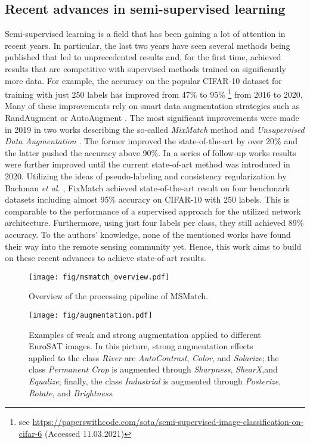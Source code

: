 \documentclass[journal]{IEEEtran}
\newcommand{\etal}{\textit{et al.}}
\begin{document}
\subsection{Recent advances in semi-supervised learning}

Semi-supervised learning is a field that has been gaining a lot of attention in recent years. In particular, the last two years have seen several methods being published that led to unprecedented results and, for the first time, achieved results that are competitive with supervised methods trained on significantly more data. For example, the accuracy on the popular CIFAR-10 dataset \cite{krizhevsky2009} for training with just 250 labels has improved from 47\% to 95\% \footnote{see \url{ https://paperswithcode.com/sota/semi-supervised-image-classification-on-cifar-6} (Accessed 11.03.2021)} from 2016 to 2020. Many of these improvements rely on smart data augmentation strategies such as RandAugment \cite{cubuk2020} or AutoAugment \cite{cubuk2018}. The most significant improvements were made in 2019 in two works describing the so-called \textit{MixMatch} \cite{berthelot2019} method and \textit{Unsupervised Data Augmentation} \cite{xie2019UDA}. The former improved the state-of-the-art by over 20\% and the latter pushed the accuracy above 90\%. In a series of follow-up works \cite{berthelot2019remixmatch,nair2019} results were further improved until the current state-of-art method was introduced in 2020. Utilizing the ideas of pseudo-labeling and consistency regularization by Bachman \etal{} \cite{bachman2014}, FixMatch \cite{kurakin2020} achieved state-of-the-art result on four benchmark datasets including almost 95\% accuracy on CIFAR-10 with 250 labels. This is comparable to the performance of a supervised approach for the utilized network architecture. Furthermore, using just four labels per class, they still achieved 89\% accuracy.
To the authors' knowledge, none of the mentioned works have found their way into the remote sensing community yet. Hence, this work aims to build on these recent advances to achieve state-of-art results.


\begin{figure*}[ht]
\centering
\texttt{[image: fig/msmatch\_overview.pdf]}
\caption{Overview of the processing pipeline of MSMatch.}
\label{fig: msmatchPipe}
\end{figure*}

\begin{figure}[ht]
\centering
\texttt{[image: fig/augmentation.pdf]}
\caption{Examples of weak and strong augmentation applied to different EuroSAT images. In this picture, strong augmentation effects applied to the class \textit{River} are \textit{AutoContrast}, \textit{Color}, and \textit{Solarize}; the class \textit{Permanent Crop} is augmented through \textit{Sharpness}, \textit{ShearX},and \textit{Equalize}; finally, the class \textit{Industrial} is augmented through \textit{Posterize}, \textit{Rotate}, and \textit{Brightness}.}
\label{fig: augmentation}
\end{figure}
\end{document}
